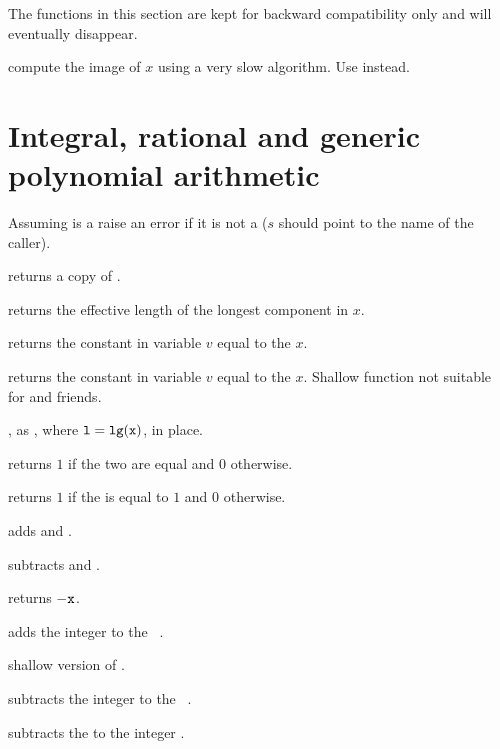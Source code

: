 The functions in this section are kept for backward compatibility only
and will eventually disappear.

 compute the image of $x$ using a very slow
algorithm. Use  instead.

\section{Integral, rational and generic polynomial arithmetic}


 Assuming  is a 
raise an error if it is not a  ($s$ should point to the name of the
caller).

 returns a copy of .

 returns the effective length of the longest
component in $x$.

 returns the constant  in variable
$v$ equal to the  $x$.

 returns the constant  in
variable $v$ equal to the  $x$. Shallow function not suitable for
 and friends.

, as , where
${\tt l} = {\tt lg(x)}$, in place.

 returns $1$ if the two  are equal
and $0$ otherwise.

 returns $1$ if the  is equal to $1$
and $0$ otherwise.

 adds  and .

 subtracts  and .

 returns $-{\tt x}$.

 adds the integer  to the
~.

 shallow version of .

 subtracts the integer  to the
~.

 subtracts the   to the
integer .

